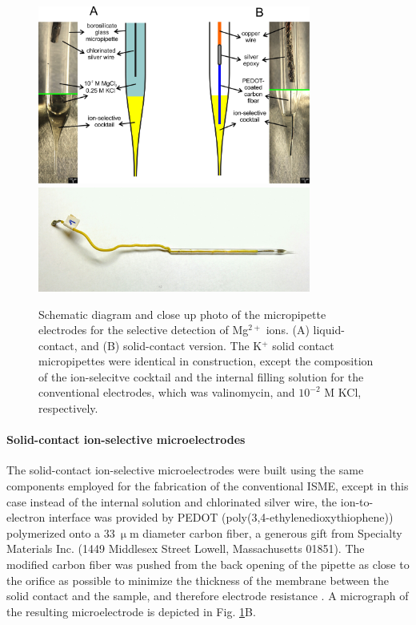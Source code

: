 \begin{figure}
\centering
\includegraphics[width=0.8\textwidth]{img/liquid_solid.jpg}
\includegraphics[width=0.8\textwidth]{img/mg_top.jpg}
\caption[Schematic diagram and close up photo of the micropipette electrodes for the selective detection of Mg$^{2+}$ ions.]{Schematic diagram and close up photo of the micropipette electrodes for the selective detection of Mg$^{2+}$ ions. (A) liquid-contact, and (B) solid-contact version.
The K$^+$ solid contact micropipettes were identical in construction, except the composition of the ion-selecitve cocktail and the internal filling solution for the conventional electrodes, which was valinomycin, and $10^{-2}$ M KCl, respectively.}
\label{fig:solid_liquid}
\end{figure}

				\paragraph{Solid-contact ion-selective microelectrodes}
The solid-contact ion-selective microelectrodes were built using the same components employed for the fabrication of the conventional ISME, except in this case instead of the internal solution and chlorinated silver wire, the ion-to-electron interface was provided by PEDOT (poly(3,4-ethylenedioxythiophene)) polymerized onto a $33~\upmu$m diameter carbon fiber, a generous gift from Specialty Materials Inc. (1449 Middlesex Street Lowell, Massachusetts 01851).
The modified carbon fiber was pushed from the back opening of the pipette as close to the orifice as possible to minimize the thickness of the membrane between the solid contact and the sample, and therefore electrode resistance \cite{gyetvai2007solid}.
A micrograph of the resulting microelectrode is depicted in Fig. \ref{fig:solid_liquid}B.
